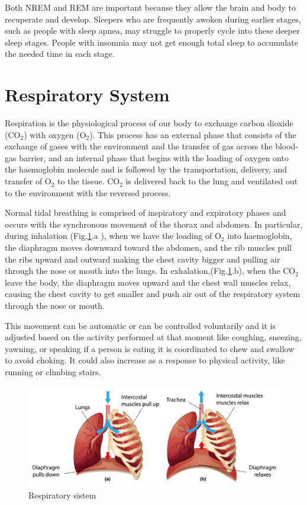 Both NREM and REM are important because they allow the brain and body to recuperate and develop. Sleepers who are frequently awoken during earlier stages, such as people with sleep apnea, may struggle to properly cycle into these deeper sleep stages. People with insomnia may not get enough total sleep to accumulate the needed time in each stage.

\section{Respiratory System}


Respiration is the physiological process\cite{FISHER1983223} of our body to exchange carbon dioxide (CO$_2$) with oxygen (O$_2$). This process has an external phase that consists of the exchange of gases with the environment and the transfer of gas across the blood-gas barrier, and an internal phase that begins with the loading of oxygen onto the haemoglobin molecule and is followed by the transportation, delivery, and transfer of O$_2$ to the tissue. CO$_2$ is delivered back to the lung and ventilated out to the environment with the reversed process.

Normal tidal breathing is comprised of inspiratory and expiratory phases and occurs with the synchronous movement of the thorax and abdomen.
In particular, during inhalation (Fig.\ref{fig:resp}.a ), when we have the loading of O$_2$ into haemoglobin, the diaphragm moves downward toward the abdomen, and the rib muscles pull the ribs upward and outward making the chest cavity bigger and pulling air through the nose or mouth into the lungs. In exhalation,(Fig.\ref{fig:resp}.b), when the CO$_2$ leave the body, the diaphragm moves upward and the chest wall muscles relax, causing the chest cavity to get smaller and push air out of the respiratory system through the nose or mouth.

This movement can be automatic or can be controlled voluntarily and it is adjusted based on the activity performed at that moment like coughing, sneezing, yawning, or speaking if a person is eating it is coordinated to chew and swallow to avoid choking. It could also increase as a response to physical activity, like running or climbing stairs\cite{DelNegro2018BreathingMatters}.\\

\vspace*{1.0cm}
\begin{figure}[H]
    \centering
    \includegraphics[width=\textwidth]{img/j338_ps1n_201111.png}
    \caption{Respiratory sistem}
    \label{fig:resp}
\end{figure}
\vspace*{1.0cm}


